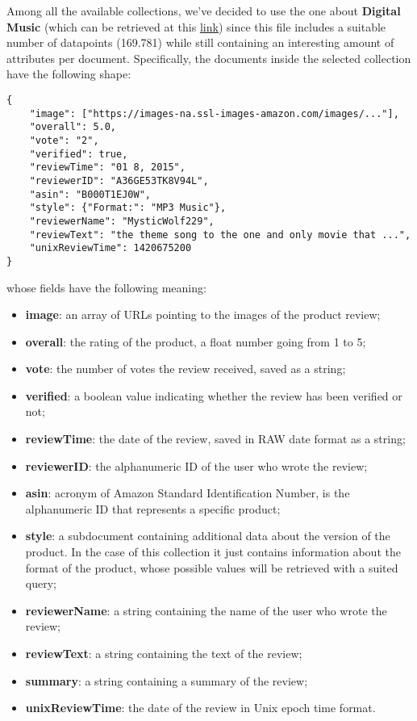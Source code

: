 Among all the available collections, we've decided to use the one about \textbf{Digital Music} (which can be retrieved at this \href{https://jmcauley.ucsd.edu/data/amazon_v2/categoryFilesSmall/Digital_Music_5.json.gz}{\color{blue}\underline{link}}) since this file includes a suitable number of datapoints (169.781) while still containing an interesting amount of attributes per document.
Specifically, the documents inside the selected collection have the following shape:
\begin{verbatim}
{
    "image": ["https://images-na.ssl-images-amazon.com/images/..."], 
    "overall": 5.0, 
    "vote": "2",
    "verified": true, 
    "reviewTime": "01 8, 2015", 
    "reviewerID": "A36GE53TK8V94L", 
    "asin": "B000T1EJ0W", 
    "style": {"Format:": "MP3 Music"}, 
    "reviewerName": "MysticWolf229", 
    "reviewText": "the theme song to the one and only movie that ...", 
    "unixReviewTime": 1420675200
}
\end{verbatim}
whose fields have the following meaning:
\begin{itemize}
    \item \textbf{image}: an array of URLs pointing to the images of the product review;
    \item \textbf{overall}: the rating of the product, a float number going from 1 to 5;
    \item \textbf{vote}: the number of votes the review received, saved as a string;
    \item \textbf{verified}: a boolean value indicating whether the review has been verified or not;
    \item \textbf{reviewTime}: the date of the review, saved in RAW date format as a string;
    \item \textbf{reviewerID}: the alphanumeric ID of the user who wrote the review;
    \item \textbf{asin}: acronym of Amazon Standard Identification Number, is the alphanumeric ID that represents a specific product;
    \item \textbf{style}: a subdocument containing additional data about the version of the product. In the case of this collection it just contains information about the format of the product, whose possible values will be retrieved with a suited query;
    \item \textbf{reviewerName}: a string containing the name of the user who wrote the review;
    \item \textbf{reviewText}: a string containing the text of the review;
    \item \textbf{summary}: a string containing a summary of the review;
    \item \textbf{unixReviewTime}: the date of the review in Unix epoch time format.
\end{itemize}